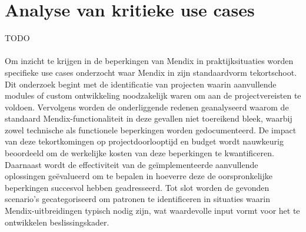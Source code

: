 \section{Analyse van kritieke use cases}
TODO
\\
\\
Om inzicht te krijgen in de beperkingen van Mendix in praktijksituaties worden specifieke use cases onderzocht waar Mendix in zijn standaardvorm tekortschoot. Dit onderzoek begint met de identificatie van projecten waarin aanvullende modules of custom ontwikkeling noodzakelijk waren om aan de projectvereisten te voldoen. Vervolgens worden de onderliggende redenen geanalyseerd waarom de standaard Mendix-functionaliteit in deze gevallen niet toereikend bleek, waarbij zowel technische als functionele beperkingen worden gedocumenteerd. De impact van deze tekortkomingen op projectdoorlooptijd en budget wordt nauwkeurig beoordeeld om de werkelijke kosten van deze beperkingen te kwantificeren. Daarnaast wordt de effectiviteit van de geïmplementeerde aanvullende oplossingen geëvalueerd om te bepalen in hoeverre deze de oorspronkelijke beperkingen succesvol hebben geadresseerd. Tot slot worden de gevonden scenario's gecategoriseerd om patronen te identificeren in situaties waarin Mendix-uitbreidingen typisch nodig zijn, wat waardevolle input vormt voor het te ontwikkelen beslissingskader.






